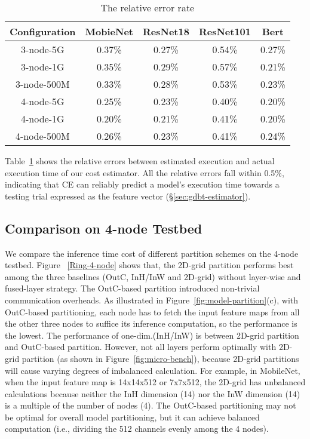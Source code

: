 \label{subsec-Prediction Accuracy of CE}
\begin{table}[t]
\renewcommand\arraystretch{1}
	\centering
	\caption{The relative error rate}
	\label{tab:prediction accuracy}
\footnotesize
	\begin{tabular}{ccccc}
		\hline
		Configuration&MobieNet & ResNet18  &  ResNet101&Bert \\
		\hline
            3-node-5G   &   0.37\% & 0.27\% &   0.54\% &  0.27\%  \\
            3-node-1G   &   0.35\% & 0.29\% &   0.57\% &  0.21\%  \\
            3-node-500M &   0.33\% & 0.28\% &   0.53\% &  0.23\%  \\
            4-node-5G   &   0.25\% & 0.23\% &   0.40\% &  0.20\%  \\
            4-node-1G   &   0.20\% & 0.21\% &   0.41\% &  0.20\%  \\
            4-node-500M &   0.26\% & 0.23\% &   0.41\% &  0.24\%  \\
            \hline
	\end{tabular} 
\end{table}

Table~\ref{tab:prediction accuracy} shows the relative errors between estimated execution and actual execution time of our cost estimator. All the relative errors fall within 0.5\%, indicating that CE can reliably predict a model's execution time towards a testing trial expressed as the feature vector (\S\ref{sec:gdbt-estimator}).

\fi

\subsection{Comparison on 4-node Testbed}
\label{4node}





We compare the inference time cost of different partition schemes on the 4-node testbed. Figure ~\ref{Ring-4-node} shows that, the 2D-grid partition performs best among the three baselines (OutC, InH/InW and 2D-grid) without layer-wise and fused-layer strategy. The OutC-based partition introduced non-trivial communication overheads. As illustrated in Figure~\ref{fig:model-partition}(c), with OutC-based partitioning, each node has to fetch the input feature maps from all the other three nodes to suffice its inference computation, so the performance is the lowest. The performance of one-dim.(InH/InW) is between 2D-grid partition and OutC-based partition. However, not all layers perform optimally with 2D-grid partition (as shown in Figure~\ref{fig:micro-bench}), because 2D-grid partitions will cause varying degrees of imbalanced calculation. For example, in MobileNet, when the input feature map is 14x14x512 or 7x7x512, the 2D-grid has unbalanced calculations because neither the InH dimension (14) nor the InW dimension (14) is a multiple of the number of nodes (4). The OutC-based partitioning may not be optimal for overall model partitioning, but it can achieve balanced computation (i.e., dividing the 512 channels evenly among the 4 nodes).



